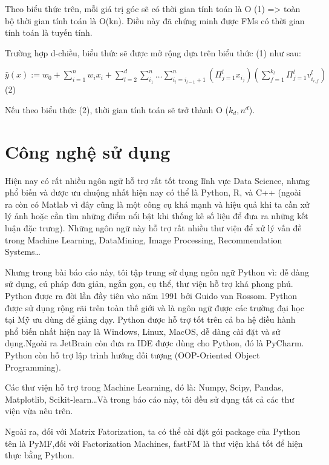\documentclass[a4paper,12pt,numbered,print,index,custombib, oneside, custommargin]{report}
\newcommand\tab[1][1cm]{\hspace*{#1}}
\begin{document}

Theo biểu thức trên, mỗi giá trị góc sẽ có thời gian tính toán là O (1) => toàn bộ thời gian tính toán là O(kn). Điều này đã chứng minh được FMs có thời gian tính toán là tuyến tính.	\par
Trường hợp d-chiều, biểu thức sẽ được mở rộng dựa trên biểu thức (1) như sau: \par
\tab $\hat{y}(x) := w_0 + \sum_{i=1}^{n}w_i x_i + \sum_{l=2}^{d}\sum_{i_1}^{n}\ldots\sum_{i_l=i_{l-1}+1}^{n}(\Pi_{j=1}^{l}x_{i_j})(\sum_{f=1}^{k_l}\Pi_{j=1}^{l}v_{i_{i,f}}^l)$ \tab (2)\par 
Nếu theo biểu thức (2), thời gian tính toán sẽ trở thành O ($k_d, n^d$).

\part{Công nghệ sử dụng}
Hiện nay có rất nhiều ngôn ngữ hỗ trợ rất tốt trong lĩnh vực Data Science, nhưng phổ biến và được ưu chuộng nhất hiện nay có thể là Python, R, và C++ (ngoài ra còn có Matlab vì đây cũng là một công cụ khá mạnh và hiệu quả khi ta cần xử lý ảnh hoặc cần tìm những điểm nổi bật khi thống kê số liệu để đưa ra những kết luận đặc trưng). Những ngôn ngữ này hỗ trợ rất nhiều thư viện để xử lý vấn đề trong Machine Learning, DataMining, Image Processing, Recommendation Systems…		\par
Nhưng trong bài báo cáo này, tôi tập trung sử dụng ngôn ngữ Python vì: dễ dàng sử dụng, cú pháp đơn giản, ngắn gọn, cụ thể, thư viện hỗ trợ khá phong phú. Python được ra đời lần đầy tiên vào năm 1991 bởi Guido van Rossom. Python được sử dụng rộng rãi trên toàn thế giới và là ngôn ngữ được các trường đại học tại Mỹ ưu dùng để giảng dạy. Python được hỗ trợ tốt trên cả ba hệ điều hành phổ biến nhất hiện nay là Windows, Linux, MacOS, dễ dàng cài đặt và sử dụng.Ngoài ra JetBrain còn đưa ra IDE được dùng cho Python, đó là PyCharm. Python còn hỗ trợ lập trình hướng đối tượng (OOP-Oriented Object Programming). \par 
Các thư viện hỗ trợ trong Machine Learning, đó là: Numpy, Scipy, Pandas, Matplotlib, Scikit-learn…Và trong báo cáo này, tôi đều sử dụng tất cả các thư viện vừa nêu trên.	\par
Ngoài ra, đối với Matrix Fatorization, ta có thể cài đặt gói package của Python tên là PyMF,đối với Factorization Machines, fastFM là thư viện khá tốt để hiện thực bằng Python.	\par
%
%
\end{document}
